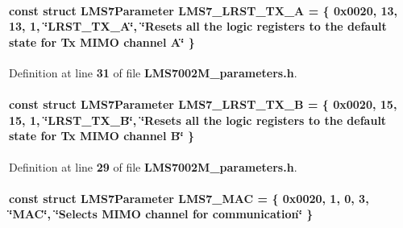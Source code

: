 \paragraph[{L\+M\+S7\+\_\+\+L\+R\+S\+T\+\_\+\+T\+X\+\_\+A}]{\setlength{\rightskip}{0pt plus 5cm}const struct {\bf L\+M\+S7\+Parameter} L\+M\+S7\+\_\+\+L\+R\+S\+T\+\_\+\+T\+X\+\_\+A = \{ 0x0020, 13, 13, 1, \char`\"{}\+L\+R\+S\+T\+\_\+\+T\+X\+\_\+\+A\char`\"{}, \char`\"{}\+Resets all the logic registers to the default state for Tx M\+I\+M\+O channel A\char`\"{} \}\hspace{0.3cm}{\ttfamily [static]}}\label{LMS7002M__parameters_8h_a0ea9dc8ffe991acb0e448f50703626ff}


Definition at line {\bf 31} of file {\bf L\+M\+S7002\+M\+\_\+parameters.\+h}.

\paragraph[{L\+M\+S7\+\_\+\+L\+R\+S\+T\+\_\+\+T\+X\+\_\+B}]{\setlength{\rightskip}{0pt plus 5cm}const struct {\bf L\+M\+S7\+Parameter} L\+M\+S7\+\_\+\+L\+R\+S\+T\+\_\+\+T\+X\+\_\+B = \{ 0x0020, 15, 15, 1, \char`\"{}\+L\+R\+S\+T\+\_\+\+T\+X\+\_\+\+B\char`\"{}, \char`\"{}\+Resets all the logic registers to the default state for Tx M\+I\+M\+O channel B\char`\"{} \}\hspace{0.3cm}{\ttfamily [static]}}\label{LMS7002M__parameters_8h_a610d4ccb61ee797f29c3bb0893eef25f}


Definition at line {\bf 29} of file {\bf L\+M\+S7002\+M\+\_\+parameters.\+h}.

\paragraph[{L\+M\+S7\+\_\+\+M\+AC}]{\setlength{\rightskip}{0pt plus 5cm}const struct {\bf L\+M\+S7\+Parameter} L\+M\+S7\+\_\+\+M\+AC = \{ 0x0020, 1, 0, 3, \char`\"{}\+M\+A\+C\char`\"{}, \char`\"{}\+Selects M\+I\+M\+O channel for communication\char`\"{} \}\hspace{0.3cm}{\ttfamily [static]}}\label{LMS7002M__parameters_8h_ae379e3060d4a298d2ceb0813e1228187}


